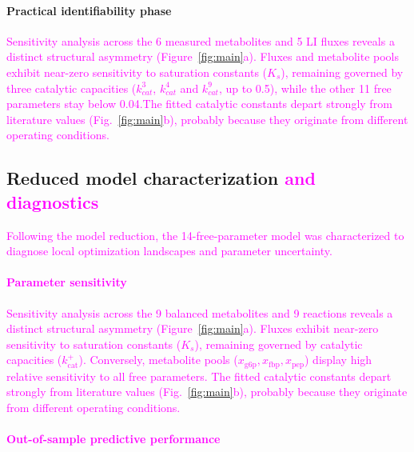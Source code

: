 \documentclass[conference]{IEEEtran}
\begin{document}
{\paragraph{Practical identifiability phase}
\textcolor{magenta}{Sensitivity analysis across the 6 measured metabolites and 5 LI fluxes reveals a distinct structural asymmetry (Figure~\ref{fig:main}a). Fluxes and metabolite pools exhibit near-zero sensitivity to saturation constants ($K_s$), remaining governed by three catalytic capacities ($k^3_{cat}$, $k^4_{cat}$ and $k^9_{cat}$, up to 0.5), while the other 11 free parameters stay below 0.04.The fitted catalytic constants depart strongly from literature values (Fig.~\ref{fig:main}b), probably because they originate from different operating conditions.}
\subsection{Reduced model characterization \textcolor{magenta}{and diagnostics}}

\textcolor{magenta}{Following the model reduction, the 14-free-parameter model was characterized to diagnose local optimization landscapes and parameter uncertainty.}

\paragraph{\textcolor{magenta}{Parameter sensitivity}}
\textcolor{magenta}{Sensitivity analysis across the 9 balanced metabolites and 9 reactions reveals a distinct structural asymmetry (Figure~\ref{fig:main}a). Fluxes exhibit near-zero sensitivity to saturation constants ($K_s$), remaining governed by catalytic capacities ($k_{\text{cat}}^+$). Conversely, metabolite pools ($x_{\text{g6p}}, x_{\text{fbp}}, x_{\text{pep}}$) display high relative sensitivity to all free parameters. The fitted catalytic constants depart strongly from literature values (Fig.~\ref{fig:main}b), probably because they originate from different operating conditions.}

\paragraph{\textcolor{magenta}{Out-of-sample predictive performance}}

}
\end{document}
